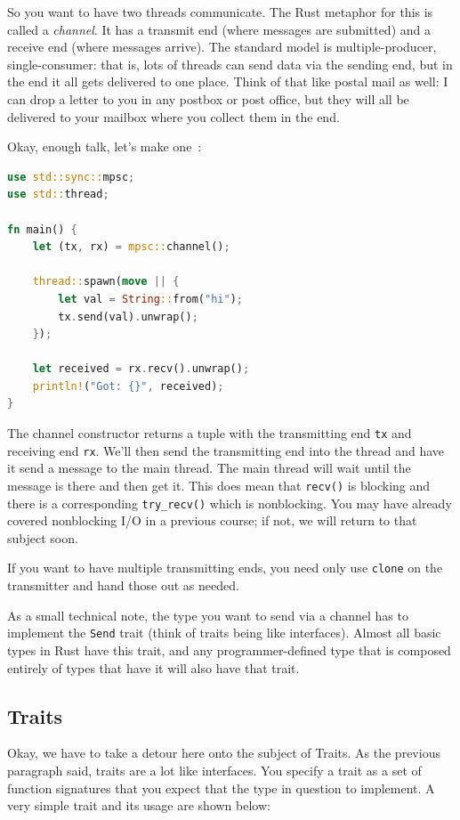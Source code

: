 \documentclass[a4paper]{report}
\begin{document}
So you want to have two threads communicate. The Rust metaphor for this is called a \textit{channel}. It has a transmit end (where messages are submitted) and a receive end (where messages arrive). The standard model is multiple-producer, single-consumer: that is, lots of threads can send data via the sending end, but in the end it all gets delivered to one place. Think of that like postal mail as well: I can drop a letter to you in any postbox or post office, but they will all be delivered to your mailbox where you collect them in the end.

Okay, enough talk, let's make one~\cite{rustdocs}:
\begin{lstlisting}[language=Rust]
use std::sync::mpsc;
use std::thread;

fn main() {
    let (tx, rx) = mpsc::channel();

    thread::spawn(move || {
        let val = String::from("hi");
        tx.send(val).unwrap();
    });

    let received = rx.recv().unwrap();
    println!("Got: {}", received);
}
\end{lstlisting}

The channel constructor returns a tuple with the transmitting end \texttt{tx} and receiving end \texttt{rx}. We'll then send the transmitting end into the thread and have it send a message to the main thread. The main thread will wait until the message is there and then get it. This does mean that \texttt{recv()} is blocking and there is a corresponding \texttt{try\_recv()} which is nonblocking. You may have already covered nonblocking I/O in a previous course; if not, we will return to that subject soon.

If you want to have multiple transmitting ends, you need only use \texttt{clone} on the transmitter and hand those out as needed. 

As a small technical note, the type you want to send via a channel has to implement the \texttt{Send} trait (think of traits being like interfaces). Almost all basic types in Rust have this trait, and any programmer-defined type that is composed entirely of types that have it will also have that trait.  


\subsection*{Traits}
Okay, we have to take a detour here onto the subject of Traits. As the previous paragraph said, traits are a lot like interfaces. You specify a trait as a set of function signatures that you expect that the type in question to implement. A very simple trait and its usage are shown below:
\end{document}
